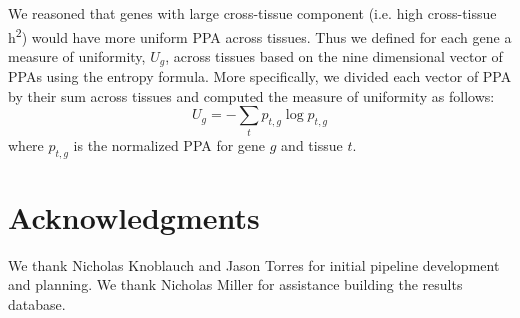 \documentclass[10pt,letterpaper]{article}
\begin{document}
We reasoned that genes with large cross-tissue component (i.e. high cross-tissue h\textsuperscript{2}) would have more uniform PPA across tissues. Thus we defined for each gene a measure of uniformity, $U_g$, across tissues based on the nine dimensional vector of PPAs using the entropy formula. More specifically, we divided each vector of PPA by their sum across tissues and computed the measure of uniformity as follows:
\[ U_g = -\sum_{t}p_{t,g} \log p_{t,g} \]
%
where \(p_{t,g}\) is the normalized PPA for gene $g$ and tissue $t$.




\section*{Acknowledgments}
We thank Nicholas Knoblauch and Jason Torres for initial pipeline
development and planning. We thank Nicholas Miller for assistance building
the results database.

%
\end{document}
